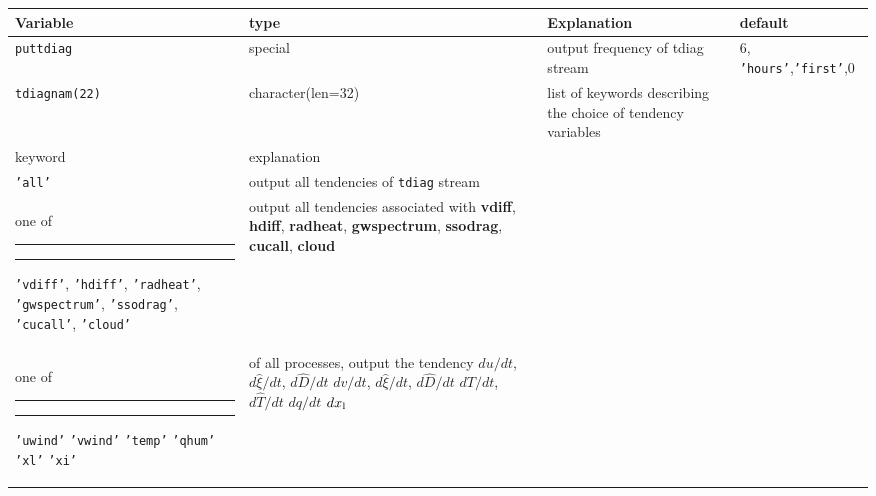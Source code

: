 \begin{appendix}
\begin{longtable}{l@{\extracolsep\fill}lp{}p{3.5cm}}
Variable & type & Explanation & default \\\hline

{\tt puttdiag} & special & output frequency of tdiag stream & 6,{\tt
  'hours'},{\tt 'first'},0\\
{\tt tdiagnam(22)} & character(len=32) & list of keywords describing
the choice of tendency variables \newline
\begin{tabular*}{7cm}{p{3cm}|p{3.2cm}}\\\hline
keyword & explanation \\\hline
{\tt 'all'} & output all tendencies of {\tt tdiag} stream\\\hline
one of \rule{2cm}{0cm} 
\rule{2cm}{0cm}\newline
{\tt 'vdiff'}, \newline 
{\tt 'hdiff'}, \newline
{\tt 'radheat'},\newline
{\tt 'gwspectrum'},\newline
{\tt 'ssodrag'},\newline
{\tt 'cucall'},\newline
{\tt 'cloud'}
&
output all tendencies
associated with \newline
{\bf vdiff},\newline
{\bf hdiff},\newline
{\bf radheat},\newline
{\bf gwspectrum},\newline
{\bf ssodrag},\newline 
{\bf cucall}, \newline
{\bf cloud}
\\\hline
one of \rule{2cm}{0cm}
\rule{2cm}{0cm}\newline
{\tt 'uwind'}\newline
{\tt 'vwind'}\newline
{\tt 'temp'}\newline
{\tt 'qhum'}\newline
{\tt 'xl'}\newline
{\tt 'xi'}\newline
&
of all processes, output the tendency\newline
$du/dt$, $d\hat{\xi}/dt$, $d\hat{D}/dt$\newline
$dv/dt$, $d\hat{\xi}/dt$, $d\hat{D}/dt$\newline
$dT/dt$, $d\hat{T}/dt$\newline
$dq/dt$\newline
$dx_{\rm l}$\newline

\end{tabular*}
\end{longtable}
\end{appendix}

